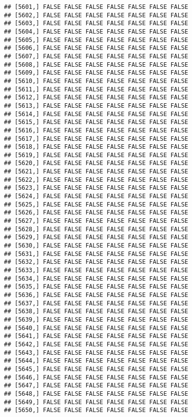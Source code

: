 \documentclass[
]{article}
\begin{document}
\begin{verbatim}
## [5601,] FALSE FALSE FALSE FALSE FALSE FALSE FALSE
## [5602,] FALSE FALSE FALSE FALSE FALSE FALSE FALSE
## [5603,] FALSE FALSE FALSE FALSE FALSE FALSE FALSE
## [5604,] FALSE FALSE FALSE FALSE FALSE FALSE FALSE
## [5605,] FALSE FALSE FALSE FALSE FALSE FALSE FALSE
## [5606,] FALSE FALSE FALSE FALSE FALSE FALSE FALSE
## [5607,] FALSE FALSE FALSE FALSE FALSE FALSE FALSE
## [5608,] FALSE FALSE FALSE FALSE FALSE FALSE FALSE
## [5609,] FALSE FALSE FALSE FALSE FALSE FALSE FALSE
## [5610,] FALSE FALSE FALSE FALSE FALSE FALSE FALSE
## [5611,] FALSE FALSE FALSE FALSE FALSE FALSE FALSE
## [5612,] FALSE FALSE FALSE FALSE FALSE FALSE FALSE
## [5613,] FALSE FALSE FALSE FALSE FALSE FALSE FALSE
## [5614,] FALSE FALSE FALSE FALSE FALSE FALSE FALSE
## [5615,] FALSE FALSE FALSE FALSE FALSE FALSE FALSE
## [5616,] FALSE FALSE FALSE FALSE FALSE FALSE FALSE
## [5617,] FALSE FALSE FALSE FALSE FALSE FALSE FALSE
## [5618,] FALSE FALSE FALSE FALSE FALSE FALSE FALSE
## [5619,] FALSE FALSE FALSE FALSE FALSE FALSE FALSE
## [5620,] FALSE FALSE FALSE FALSE FALSE FALSE FALSE
## [5621,] FALSE FALSE FALSE FALSE FALSE FALSE FALSE
## [5622,] FALSE FALSE FALSE FALSE FALSE FALSE FALSE
## [5623,] FALSE FALSE FALSE FALSE FALSE FALSE FALSE
## [5624,] FALSE FALSE FALSE FALSE FALSE FALSE FALSE
## [5625,] FALSE FALSE FALSE FALSE FALSE FALSE FALSE
## [5626,] FALSE FALSE FALSE FALSE FALSE FALSE FALSE
## [5627,] FALSE FALSE FALSE FALSE FALSE FALSE FALSE
## [5628,] FALSE FALSE FALSE FALSE FALSE FALSE FALSE
## [5629,] FALSE FALSE FALSE FALSE FALSE FALSE FALSE
## [5630,] FALSE FALSE FALSE FALSE FALSE FALSE FALSE
## [5631,] FALSE FALSE FALSE FALSE FALSE FALSE FALSE
## [5632,] FALSE FALSE FALSE FALSE FALSE FALSE FALSE
## [5633,] FALSE FALSE FALSE FALSE FALSE FALSE FALSE
## [5634,] FALSE FALSE FALSE FALSE FALSE FALSE FALSE
## [5635,] FALSE FALSE FALSE FALSE FALSE FALSE FALSE
## [5636,] FALSE FALSE FALSE FALSE FALSE FALSE FALSE
## [5637,] FALSE FALSE FALSE FALSE FALSE FALSE FALSE
## [5638,] FALSE FALSE FALSE FALSE FALSE FALSE FALSE
## [5639,] FALSE FALSE FALSE FALSE FALSE FALSE FALSE
## [5640,] FALSE FALSE FALSE FALSE FALSE FALSE FALSE
## [5641,] FALSE FALSE FALSE FALSE FALSE FALSE FALSE
## [5642,] FALSE FALSE FALSE FALSE FALSE FALSE FALSE
## [5643,] FALSE FALSE FALSE FALSE FALSE FALSE FALSE
## [5644,] FALSE FALSE FALSE FALSE FALSE FALSE FALSE
## [5645,] FALSE FALSE FALSE FALSE FALSE FALSE FALSE
## [5646,] FALSE FALSE FALSE FALSE FALSE FALSE FALSE
## [5647,] FALSE FALSE FALSE FALSE FALSE FALSE FALSE
## [5648,] FALSE FALSE FALSE FALSE FALSE FALSE FALSE
## [5649,] FALSE FALSE FALSE FALSE FALSE FALSE FALSE
## [5650,] FALSE FALSE FALSE FALSE FALSE FALSE FALSE

\end{verbatim}
\end{document}
